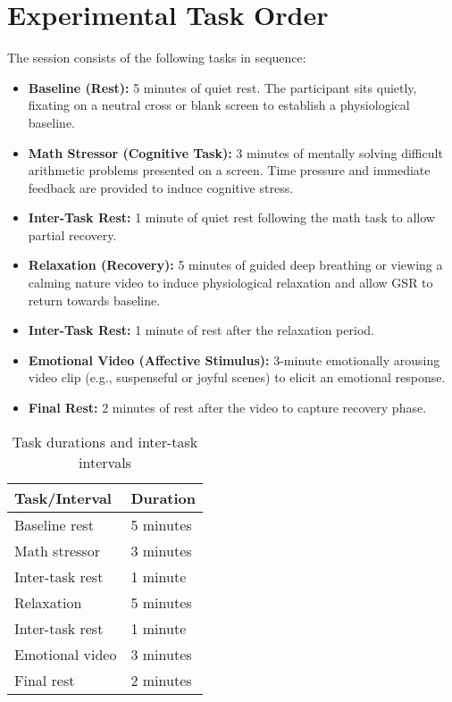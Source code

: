 \section{Experimental Task Order}
The session consists of the following tasks in sequence:
\begin{itemize}
    \item \textbf{Baseline (Rest):} 5 minutes of quiet rest. The participant sits quietly, fixating on a neutral cross or blank screen to establish a physiological baseline.
    \item \textbf{Math Stressor (Cognitive Task):} 3 minutes of mentally solving difficult arithmetic problems presented on a screen. Time pressure and immediate feedback are provided to induce cognitive stress.
    \item \textbf{Inter-Task Rest:} 1 minute of quiet rest following the math task to allow partial recovery.
    \item \textbf{Relaxation (Recovery):} 5 minutes of guided deep breathing or viewing a calming nature video to induce physiological relaxation and allow GSR to return towards baseline.
    \item \textbf{Inter-Task Rest:} 1 minute of rest after the relaxation period.
    \item \textbf{Emotional Video (Affective Stimulus):} 3-minute emotionally arousing video clip (e.g., suspenseful or joyful scenes) to elicit an emotional response.
    \item \textbf{Final Rest:} 2 minutes of rest after the video to capture recovery phase.
\end{itemize}

\begin{table}[h]
    \centering
    \caption{Task durations and inter-task intervals}
    \begin{tabular}{ll}
        \hline
        Task/Interval   & Duration  \\
        \hline
        Baseline rest   & 5 minutes \\
        Math stressor   & 3 minutes \\
        Inter-task rest & 1 minute  \\
        Relaxation      & 5 minutes \\
        Inter-task rest & 1 minute  \\
        Emotional video & 3 minutes \\
        Final rest      & 2 minutes \\
        \hline
    \end{tabular}
\end{table}



